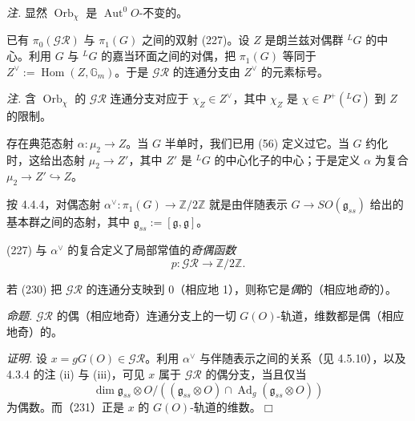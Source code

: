 \emph{注.} 显然 $\operatorname{Orb}_\chi$ 是 $\operatorname{Aut}^0 O$-不变的。

 已有 $\pi_0(\mathcal{GR})$ 与 $\pi_1(G)$ 之间的双射 (227)。设 $Z$ 是朗兰兹对偶群 ${}^LG$ 的中心。利用 $G$ 与 ${}^LG$ 的嘉当环面之间的对偶，把 $\pi_1(G)$ 等同于 $Z^\vee:=\operatorname{Hom}(Z,\mathbb{G}_m)$。于是 $\mathcal{GR}$ 的连通分支由 $Z^\vee$ 的元素标号。

\emph{注.} 含 $\operatorname{Orb}_\chi$ 的 $\mathcal{GR}$ 连通分支对应于 $\chi_Z\in Z^\vee$，其中 $\chi_Z$ 是 $\chi\in P^+({}^LG)$ 到 $Z$ 的限制。

 存在典范态射 $\alpha:\mu_2\to Z$。当 $G$ 半单时，我们已用 (56) 定义过它。当 $G$ 约化时，这给出态射 $\mu_2\to Z'$，其中 $Z'$ 是 ${}^LG$ 的中心化子的中心；于是定义 $\alpha$ 为复合 $\mu_2\to Z'\hookrightarrow Z$。

按 4.4.4，对偶态射 $\alpha^\vee:\pi_1(G)\to\mathbb{Z}/2\mathbb{Z}$ 就是由伴随表示 $G\to SO(\mathfrak{g}_{ss})$ 给出的基本群之间的态射，其中 $\mathfrak{g}_{ss}:=[\mathfrak{g},\mathfrak{g}]$。

(227) 与 $\alpha^\vee$ 的复合定义了局部常值的\emph{奇偶函数}
\begin{equation}\tag{230}
p:\mathcal{GR}\to\mathbb{Z}/2\mathbb{Z}.
\end{equation}

若 (230) 把 $\mathcal{GR}$ 的连通分支映到 0（相应地 1），则称它是\emph{偶}的（相应地\emph{奇}的）。

 \emph{命题.} $\mathcal{GR}$ 的偶（相应地奇）连通分支上的一切 $G(O)$-轨道，维数都是偶（相应地奇）的。


\emph{证明.} 设 $x=gG(O)\in\mathcal{GR}$。利用 $\alpha^{\vee}$ 与伴随表示之间的关系（见 4.5.10），以及 4.3.4 的注 (ii) 与 (iii)，可见 $x$ 属于 $\mathcal{GR}$ 的偶分支，当且仅当
\begin{equation}\tag{231}
\dim\mathfrak{g}_{ss}\otimes O/((\mathfrak{g}_{ss}\otimes O)\cap\operatorname{Ad}_g(\mathfrak{g}_{ss}\otimes O))
\end{equation}
为偶数。而（231）正是 $x$ 的 $G(O)$-轨道的维数。\hfill$\Box$

